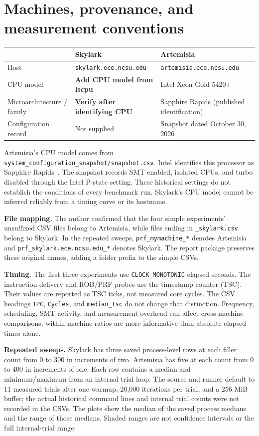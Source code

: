 \documentclass[11pt]{article}
\newcommand{\pending}[1]{\textcolor{red!65!black}{\textbf{#1}}}
\begin{document}
\section{Machines, provenance, and measurement conventions}
\begin{tabularx}{\linewidth}{lXX}\toprule
 & Skylark & Artemisia\\\midrule
Host & \texttt{skylark.ece.ncsu.edu} & \texttt{artemisia.ece.ncsu.edu}\\
CPU model & \pending{Add CPU model from lscpu} & Intel Xeon Gold 5420+\\
Microarchitecture / family & \pending{Verify after identifying CPU} & Sapphire Rapids (published identification)\\
Configuration record & Not supplied & Snapshot dated October 30, 2026\\\bottomrule
\end{tabularx}

Artemisia's CPU model comes from \texttt{system\_configuration\_snapshot/snapshot.csv}. Intel identifies this processor as Sapphire Rapids~\cite{intel}. The snapshot records SMT enabled, isolated CPUs, and turbo disabled through the Intel P-state setting. These historical settings do not establish the conditions of every benchmark run. Skylark's CPU model cannot be inferred reliably from a timing curve or its hostname.

\textbf{File mapping.} The author confirmed that the four simple experiments' unsuffixed CSV files belong to Artemisia, while files ending in \texttt{\_skylark.csv} belong to Skylark. In the repeated sweeps, \texttt{prf\_mymachine\_*} denotes Artemisia and \texttt{prf\_skylark.ece.ncsu.edu\_*} denotes Skylark. The report package preserves these original names, adding a folder prefix to the simple CSVs.

\textbf{Timing.} The first three experiments use \texttt{CLOCK\_MONOTONIC} elapsed seconds. The instruction-delivery and ROB/PRF probes use the timestamp counter (TSC). Their values are reported as TSC ticks, not measured core cycles. The CSV headings \texttt{IPC}, \texttt{Cycles}, and \texttt{median\_tsc} do not change that distinction. Frequency, scheduling, SMT activity, and measurement overhead can affect cross-machine comparisons; within-machine ratios are more informative than absolute elapsed times alone.

\textbf{Repeated sweeps.} Skylark has three saved process-level rows at each filler count from 0 to 300 in increments of two. Artemisia has five at each count from 0 to 400 in increments of one. Each row contains a median and minimum/maximum from an internal trial loop. The source and runner default to 11 measured trials after one warmup, 20,000 iterations per trial, and a 256 MiB buffer; the actual historical command lines and internal trial counts were not recorded in the CSVs. The plots show the median of the saved process medians and the range of those medians. Shaded ranges are not confidence intervals or the full internal-trial range.
\end{document}
